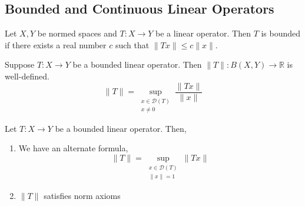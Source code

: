 \subsection{Bounded and Continuous Linear Operators}
\begin{definition}
	Let $X,Y$ be normed spaces and $T:X \to Y$ be a linear operator.
	Then $T$ is bounded if there exists a real number $c$ such that $\|Tx\| \le c\|x\|$.
\end{definition}

	Suppose $T : X \to Y$ be a bounded linear operator.
	Then $\|T\| : B(X,Y) \to \mathbb{R}$ is well-defined.
		\[ \|T\| = \sup_{\substack{x \in \mathscr{D}(T) \\ x \ne 0}} \frac{\|Tx\|}{\|x\|} \]
\begin{lemma}
	Let $T : X \to Y$ be a bounded linear operator.
	Then,
	\begin{enumerate}
		\item We have an alternate formula, \[ \|T\| = \sup_{\substack{x \in \mathscr{D}(T) \\ \|x\| = 1}} \|Tx\| \]
		\item $\|T\|$ satisfies norm axioms
	\end{enumerate}
\end{lemma}
